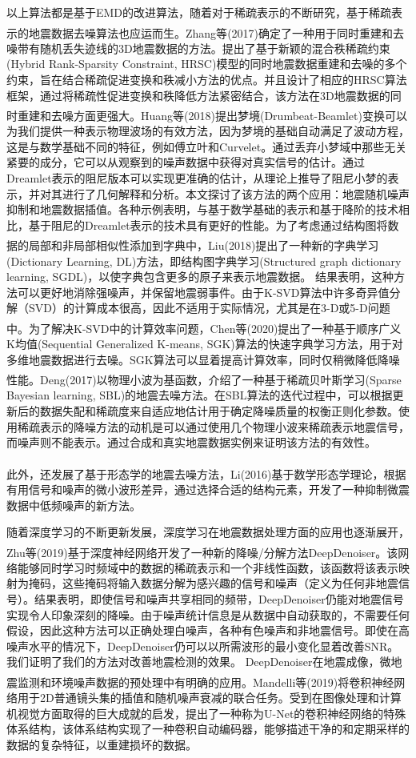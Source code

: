 \documentclass[11pt]{article}
\newcommand{\upcite}[1]{\textsuperscript{\textsuperscript{\cite{#1}}}}
\begin{document}
以上算法都是基于EMD的改进算法，随着对于稀疏表示的不断研究，基于稀疏表示的地震数据去噪算法也应运而生。Zhang等\upcite{ZhangD2017}(2017)确定了一种用于同时重建和去噪带有随机丢失迹线的3D地震数据的方法。提出了基于新颖的混合秩稀疏约束(Hybrid Rank-Sparsity Constraint, HRSC)模型的同时地震数据重建和去噪的多个约束，旨在结合稀疏促进变换和秩减小方法的优点。并且设计了相应的HRSC算法框架，通过将稀疏性促进变换和秩降低方法紧密结合，该方法在3D地震数据的同时重建和去噪方面更强大。Huang等\upcite{HuangW2018}(2018)提出梦境(Drumbeat-Beamlet)变换可以为我们提供一种表示物理波场的有效方法，因为梦境的基础自动满足了波动方程，这是与数学基础不同的特征，例如傅立叶和Curvelet。通过丢弃小梦域中那些无关紧要的成分，它可以从观察到的噪声数据中获得对真实信号的估计。通过Dreamlet表示的阻尼版本可以实现更准确的估计，从理论上推导了阻尼小梦的表示，并对其进行了几何解释和分析。本文探讨了该方法的两个应用：地震随机噪声抑制和地震数据插值。各种示例表明，与基于数学基础的表示和基于降阶的技术相比，基于阻尼的Dreamlet表示的技术具有更好的性能。为了考虑通过结构图将数据的局部和非局部相似性添加到字典中，Liu\upcite{LiuL2018}(2018)提出了一种新的字典学习(Dictionary Learning, DL)方法，即结构图字典学习(Structured graph dictionary learning, SGDL)，以使字典包含更多的原子来表示地震数据。 结果表明，这种方法可以更好地消除强噪声，并保留地震弱事件。由于K-SVD算法中许多奇异值分解（SVD）的计算成本很高，因此不适用于实际情况，尤其是在3-D或5-D问题中。为了解决K-SVD中的计算效率问题，Chen等\upcite{Chen2020}(2020)提出了一种基于顺序广义K均值(Sequential Generalized K-means, SGK)算法的快速字典学习方法，用于对多维地震数据进行去噪。SGK算法可以显着提高计算效率，同时仅稍微降低降噪性能。Deng\upcite{DengL2017}(2017)以物理小波为基函数，介绍了一种基于稀疏贝叶斯学习(Sparse Bayesian learning, SBL)的地震去噪方法。在SBL算法的迭代过程中，可以根据更新后的数据失配和稀疏度来自适应地估计用于确定降噪质量的权衡正则化参数。使用稀疏表示的降噪方法的动机是可以通过使用几个物理小波来稀疏表示地震信号，而噪声则不能表示。通过合成和真实地震数据实例来证明该方法的有效性。
\par
此外，还发展了基于形态学的地震去噪方法，Li\upcite{LiH2016}(2016)基于数学形态学理论，根据有用信号和噪声的微小波形差异，通过选择合适的结构元素，开发了一种抑制微震数据中低频噪声的新方法。
\par
随着深度学习的不断更新发展，深度学习在地震数据处理方面的应用也逐渐展开，Zhu等\upcite{ZhuW2019}(2019)基于深度神经网络开发了一种新的降噪/分解方法DeepDenoiser。该网络能够同时学习时频域中的数据的稀疏表示和一个非线性函数，该函数将该表示映射为掩码，这些掩码将输入数据分解为感兴趣的信号和噪声（定义为任何非地震信号）。结果表明，即使信号和噪声共享相同的频带，DeepDenoiser仍能对地震信号实现令人印象深刻的降噪。由于噪声统计信息是从数据中自动获取的，不需要任何假设，因此这种方法可以正确处理白噪声，各种有色噪声和非地震信号。即使在高噪声水平的情况下，DeepDenoiser仍可以以所需波形的最小变化显着改善SNR。我们证明了我们的方法对改善地震检测的效果。 DeepDenoiser在地震成像，微地震监测和环境噪声数据的预处理中有明确的应用。Mandelli等\upcite{Mandelli2019}(2019)将卷积神经网络用于2D普通镜头集的插值和随机噪声衰减的联合任务。受到在图像处理和计算机视觉方面取得的巨大成就的启发，提出了一种称为U-Net的卷积神经网络的特殊体系结构，该体系结构实现了一种卷积自动编码器，能够描述干净的和定期采样的数据的复杂特征，以重建损坏的数据。
\end{document}
